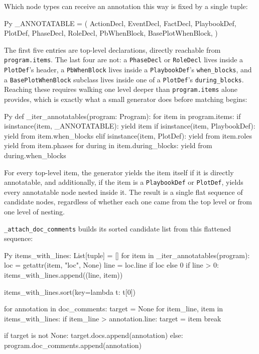 Which node types can receive an annotation this way is fixed by a single tuple:
\begin{codeblock}[]{Py}
_ANNOTATABLE = (
    ActionDecl, EventDecl, FactDecl, PlaybookDef, PlotDef,
    PhaseDecl, RoleDecl, PbWhenBlock, BasePlotWhenBlock,
)
\end{codeblock}
The first five entries are top-level declarations, directly reachable from \lstinline|program.items|. The last four are not: a \lstinline|PhaseDecl| or \lstinline|RoleDecl| lives inside a \lstinline|PlotDef|'s header, a \lstinline|PbWhenBlock| lives inside a \lstinline|PlaybookDef|'s \lstinline|when_blocks|, and a \lstinline|BasePlotWhenBlock| subclass lives inside one of a \lstinline|PlotDef|'s \lstinline|during_blocks|. Reaching these requires walking one level deeper than \lstinline|program.items| alone provides, which is exactly what a small generator does before matching begins:
\begin{codeblock}[]{Py}
def _iter_annotatables(program: Program):
    for item in program.items:
        if isinstance(item, _ANNOTATABLE):
            yield item
        if isinstance(item, PlaybookDef):
            yield from item.when_blocks
        elif isinstance(item, PlotDef):
            yield from item.roles
            yield from item.phases
            for during in item.during_blocks:
                yield from during.when_blocks
\end{codeblock}
For every top-level item, the generator yields the item itself if it is directly annotatable, and additionally, if the item is a \lstinline|PlaybookDef| or \lstinline|PlotDef|, yields every annotatable node nested inside it. The result is a single flat sequence of candidate nodes, regardless of whether each one came from the top level or from one level of nesting.

\lstinline|_attach_doc_comments| builds its sorted candidate list from this flattened sequence:

\begin{codeblock}[]{Py}
items_with_lines: List[tuple] = []
for item in _iter_annotatables(program):
    loc = getattr(item, "loc", None)
    line = loc.line if loc else 0
    if line > 0:
        items_with_lines.append((line, item))

items_with_lines.sort(key=lambda t: t[0])

for annotation in doc_comments:
    target = None
    for item_line, item in items_with_lines:
        if item_line > annotation.line:
            target = item
            break

    if target is not None:
        target.docs.append(annotation)
    else:
        program.doc_comments.append(annotation)
\end{codeblock}

